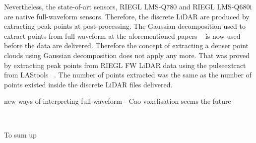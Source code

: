 \documentclass{subfiles}
\begin{document}
	\par Nevertheless, the state-of-art sensors, RIEGL LMS-Q780 and RIEGL LMS-Q680i are native full-waveform sensors. Therefore, the discrete LiDAR are produced by extracting peak points at post-processing. The Gaussian decomposition used to extract points from full-waveform at the aforementioned papers ~\cite{bibid} is now used  before the data are delivered. Therefore the concept of extracting a denser point clouds using Gaussian decomposition does not apply any more. That was proved by extracting peak points from RIEGL FW LiDAR data using the pulseextract from LAStools ~\cite{LAStools}. The number of points extracted was the same as the number of points existed inside the discrete LiDAR files delivered.

	
	\par new ways of interpreting full-waveform - Cao voxelisation seems the future
	
	~\cite{Cao2016} 
	
    \par To sum up 
    
\end{document}

